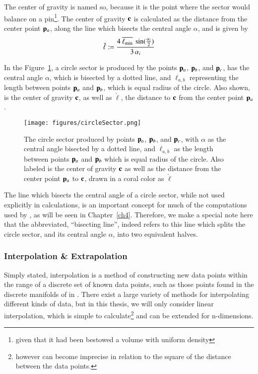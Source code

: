 The center of gravity is named so, because it is the point where the sector would balance on a pin\footnote{given that it had been bestowed a volume with uniform density}. The center of gravity $\mathbf{c}$ is calculated as the distance from the center point $\mathbf{p}_a$, along the line which bisects the central angle $\alpha$, and is given by
%
\begin{equation}
	\check{\ell} := \frac{4\:\overline{\ell_\text{min}}\:\sin(\frac{\alpha_i}{2})}{3\,\alpha_i}
	\label{eq:ch2distToCoG}
\end{equation}%
%
%

In the Figure~\ref{fig:circleSector}, a circle sector is produced by the points $\mathbf{p}_a$, $\mathbf{p}_b$, and $\mathbf{p}_c$, has the central angle $\alpha$, which is bisected by a dotted line, and $\ell_{a,b}$ representing the length between points $\mathbf{p}_a$ and $\mathbf{p}_b$, which is equal radius of the circle. Also shown, is the center of gravity $\mathbf{c}$, as well as $\check{\ell}$, the distance to $\mathbf{c}$ from the center point $\mathbf{p}_a$.

\begin{figure}[ht]
\ffigbox
	{\texttt{[image: figures/circleSector.png]}}
	{\caption[A Circle Sector in Detail]{The circle sector produced by points $\mathbf{p}_a$, $\mathbf{p}_b$, and $\mathbf{p}_c$, with $\alpha$ as the central angle bisected by a dotted line, and $\ell_{a,b}$ as the length between points $\mathbf{p}_a$ and $\mathbf{p}_b$ which is equal radius of the circle. Also labeled is the center of gravity $\mathbf{c}$ as well as the distance from the center point $\mathbf{p}_a$ to $\mathbf{c}$, drawn in a coral color as $\check{\ell}$}\label{fig:circleSector}}
\end{figure}

The line which bisects the central angle of a circle sector, while not used explicitly in calculations, is an important concept for much of the computations used by , as will be seen in Chapter~\ref{ch4}. Therefore, we make a special note here that the abbreviated, ``bisecting line'', indeed refers to this line which splits the circle sector, and its central angle $\alpha$, into two equivalent halves.%
%

%
%
\subsubsection{Interpolation \& Extrapolation}
\label{ch2sETBssGsssIE}
Simply stated, interpolation is a method of constructing new data points within the range of a discrete set of known data points, such as those points found in the discrete manifolds of in \tdd{}. There exist a large variety of methods for interpolating different kinds of data, but in this thesis, we will only consider linear interpolation, which is simple to calculate\footnote{however can become imprecise in relation to the square of the distance between the data points.} and can be extended for n-dimensions.

